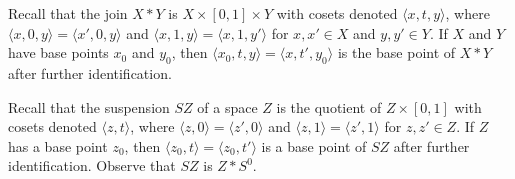 Recall that the join $X \ast Y$ is $X \times [0,1] \times Y$ with cosets denoted $\langle x,t,y\rangle$, where $\langle x,0,y\rangle = \langle x',0,y\rangle$ and $\langle x,1,y\rangle = \langle x,1,y'\rangle$ for $x, x' \in X$ and $y, y' \in Y$. If $X$ and $Y$ have base points $x_0$ and $y_0$, then $\langle x_0,t,y\rangle = \langle x,t',y_0\rangle$ is the base point of $X \ast Y$ after further identification.

Recall that the suspension $SZ$ of a space $Z$ is the quotient of $Z \times [0,1]$ with cosets denoted $\langle z,t\rangle$, where $\langle z,0\rangle = \langle z',0\rangle$ and $\langle z,1\rangle = \langle z',1\rangle$ for $z, z' \in Z$. If $Z$ has a base point $z_0$, then $\langle z_0,t\rangle = \langle z_0,t'\rangle$ is a base point of $SZ$ after further identification. Observe that $SZ$ is $Z \ast S^0$.
